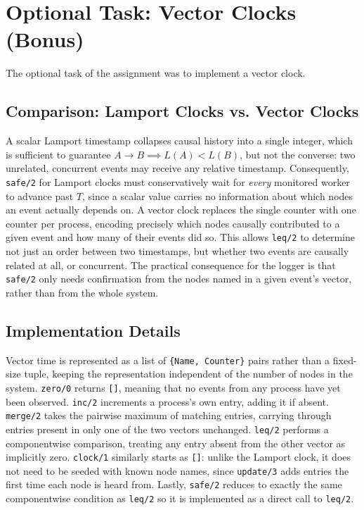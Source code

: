 \documentclass[a4paper, 11pt]{article}
\begin{document}
\section{Optional Task: Vector Clocks (Bonus)}
The optional task of the assignment was to implement a vector clock.

\subsection{Comparison: Lamport Clocks vs. Vector Clocks}
A scalar Lamport timestamp collapses causal history into a single integer, which is sufficient to guarantee $A \rightarrow B \implies L(A) < L(B)$, but not the converse: two unrelated, concurrent events may receive any relative timestamp. Consequently, \texttt{safe/2} for Lamport clocks must conservatively wait for \emph{every} monitored worker to advance past $T$, since a scalar value carries no information about which nodes an event actually depends on. A vector clock replaces the single counter with one counter per process, encoding precisely which nodes causally contributed to a given event and how many of their events did so. This allows \texttt{leq/2} to determine not just an order between two timestamps, but whether two events are causally related at all, or concurrent. The practical consequence for the logger is that \texttt{safe/2} only needs confirmation from the nodes named in a given event's vector, rather than from the whole system.

\subsection{Implementation Details}
Vector time is represented as a list of \texttt{\{Name, Counter\}} pairs rather than a fixed-size tuple, keeping the representation independent of the number of nodes in the system. \texttt{zero/0} returns \texttt{[]}, meaning that no events from any process have yet been observed. \texttt{inc/2} increments a process's own entry, adding it if absent. \texttt{merge/2} takes the pairwise maximum of matching entries, carrying through entries present in only one of the two vectors unchanged. \texttt{leq/2} performs a componentwise comparison, treating any entry absent from the other vector as implicitly zero. \texttt{clock/1} similarly starts as \texttt{[]}: unlike the Lamport clock, it does not need to be seeded with known node names, since \texttt{update/3} adds entries the first time each node is heard from. Lastly, \texttt{safe/2} reduces to exactly the same componentwise condition as \texttt{leq/2} so it is implemented as a direct call to \texttt{leq/2}.
\end{document}
